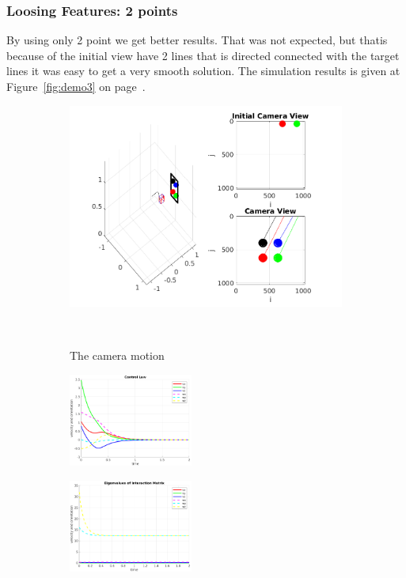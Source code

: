 \documentclass[a4paper,12pt]{article}
\begin{document}
\subsubsection{Loosing Features: 2 points}
By using only 2 point we get better results. That was not expected, but thatis because of the 
initial view have 2 lines that is directed connected with the target lines it was easy to get a 
very smooth solution.  The simulation results is given at Figure~\ref{fig:demo3} on page~\pageref{fig:demo3}.

\begin{figure}[t!]
		 \begin{subfigure}[b]{\textwidth}         
         	\centering
	         \includegraphics[width=13cm]{../results/Demo3-simulation.png}
    	     \caption{The camera motion}
    	     \vspace~
		 \end{subfigure}
         \begin{subfigure}[b]{0.32\textwidth}
        	\centering
	        \includegraphics[height=1.2in]{../results/Demo3-control-law.png}
		 \end{subfigure}
         \begin{subfigure}[b]{0.2\textwidth}
        	\centering
	        \includegraphics[height=1.2in]{../results/Demo3-eignen.png}

\end{subfigure}
\end{figure}
\end{document}
